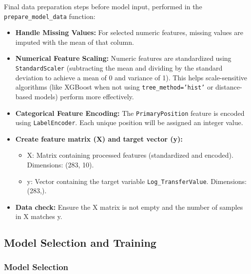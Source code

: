 \documentclass[12pt, a4paper]{report}
\begin{document}
Final data preparation steps before model input, performed in the \texttt{prepare\_model\_data} function:
\begin{itemize}
    \item \textbf{Handle Missing Values:} For selected numeric features, missing values are imputed with the mean of that column.
    \item \textbf{Numerical Feature Scaling:} Numeric features are standardized using \texttt{StandardScaler} (subtracting the mean and dividing by the standard deviation to achieve a mean of 0 and variance of 1). This helps scale-sensitive algorithms (like XGBoost when not using \texttt{tree\_method='hist'} or distance-based models) perform more effectively.
    \item \textbf{Categorical Feature Encoding:} The \texttt{PrimaryPosition} feature is encoded using \texttt{LabelEncoder}. Each unique position will be assigned an integer value.
    \item \textbf{Create feature matrix (X) and target vector (y):}
    \begin{itemize}
        \item X: Matrix containing processed features (standardized and encoded). Dimensions: (283, 10).
        \item y: Vector containing the target variable \texttt{Log\_TransferValue}. Dimensions: (283,).
    \end{itemize}
    \item \textbf{Data check:} Ensure the X matrix is not empty and the number of samples in X matches y.
\end{itemize}

\subsection{Model Selection and Training}
\subsubsection{Model Selection}
\end{document}
